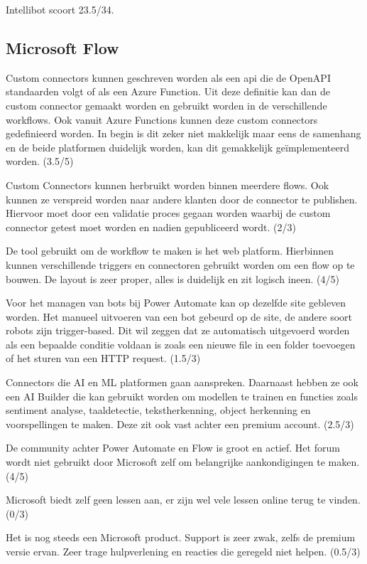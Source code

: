 Intellibot scoort 23.5/34.

\subsection{Microsoft Flow}

Custom connectors kunnen geschreven worden als een \acrshort{api} die de OpenAPI standaarden volgt of als een Azure Function. Uit deze definitie kan dan de custom connector gemaakt worden en gebruikt worden in de verschillende workflows. Ook vanuit Azure Functions kunnen deze custom connectors gedefinieerd worden. In begin is dit zeker niet makkelijk maar eens de samenhang en de beide platformen duidelijk worden, kan dit gemakkelijk geïmplementeerd worden. (3.5/5)

Custom Connectors kunnen herbruikt worden binnen meerdere flows. Ook kunnen ze verspreid worden naar andere klanten door de connector te publishen. Hiervoor moet door een validatie proces gegaan worden waarbij de custom connector getest moet worden en nadien gepubliceerd wordt. (2/3)

De tool gebruikt om de workflow te maken is het web platform. Hierbinnen kunnen verschillende triggers en connectoren gebruikt worden om een flow op te bouwen. De layout is zeer proper, alles is duidelijk en zit logisch ineen. (4/5)

Voor het managen van bots bij Power Automate kan op dezelfde site gebleven worden. Het manueel uitvoeren van een bot gebeurd op de site, de andere soort robots zijn trigger-based. Dit wil zeggen dat ze automatisch uitgevoerd worden als een bepaalde conditie voldaan is zoals een nieuwe file in een folder toevoegen of het sturen van een HTTP request. (1.5/3)

Connectors die AI en ML platformen gaan aanspreken. Daarnaast hebben ze ook een AI Builder die kan gebruikt worden om modellen te trainen en functies zoals sentiment analyse, taaldetectie, tekstherkenning, object herkenning en voorspellingen te maken. Deze zit ook vast achter een premium account. (2.5/3)

De community achter Power Automate en Flow is groot en actief. Het forum wordt niet gebruikt door Microsoft zelf om belangrijke aankondigingen te maken. (4/5)

Microsoft biedt zelf geen lessen aan, er zijn wel vele lessen online terug te vinden. (0/3)

Het is nog steeds een Microsoft product. Support is zeer zwak, zelfs de premium versie ervan. Zeer trage hulpverlening en reacties die geregeld niet helpen. (0.5/3)

